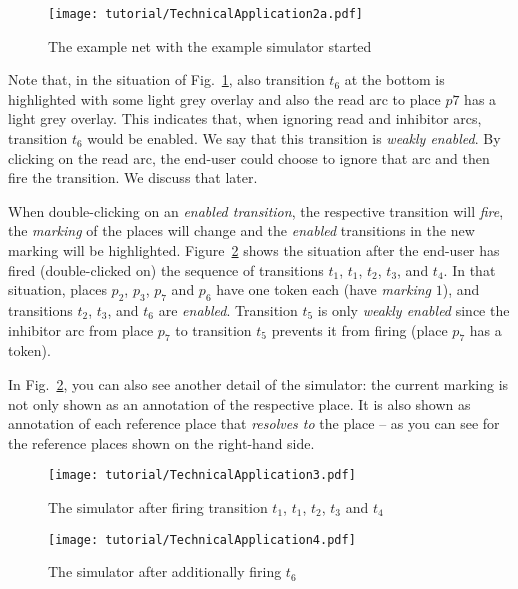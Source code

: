 \begin{figure}[hbtp!!]
  \centerline{\texttt{[image: tutorial/TechnicalApplication2a.pdf]}}
  \caption{The example net with the example simulator started}
  \label{fig:tutorial:app2}
\end{figure}

Note that, in the situation of  Fig.~\ref{fig:tutorial:app2}, also transition
$t_6$ at the bottom is highlighted with some light grey overlay and also
the read arc to place $p7$ has a light grey overlay. This indicates that, when
ignoring read and inhibitor arcs, transition $t_6$ would be enabled. We say
that this transition is \emph{weakly enabled}. By clicking on the read arc,
the end-user could choose to ignore that arc and then fire the transition. We
discuss that later.

When double-clicking on an \emph{enabled transition}, the respective transition
will \emph{fire}, the \emph{marking} of the places will change and the
\emph{enabled} transitions in the new marking will be highlighted. Figure~\ref{fig:tutorial:app3} shows
the situation after the end-user has fired (double-clicked on) the sequence
of transitions $t_1$, $t_1$, $t_2$, $t_3$, and $t_4$. In that situation, places
$p_2$, $p_3$, $p_7$ and $p_6$ have one token each (have \emph{marking} $1$), and
transitions $t_2$,  $t_3$, and $t_6$ are \emph{enabled}. Transition $t_5$ is
only \emph{weakly enabled} since the inhibitor arc from place $p_7$ to
transition $t_5$ prevents it from firing (place $p_7$ has a token).

In Fig.~\ref{fig:tutorial:app3}, you can also see another detail of the
simulator: the current marking is not only shown as an annotation of the
respective place. It is also shown as annotation of each reference place
that \emph{resolves to} the place -- as you can see for the reference places
shown on the right-hand side.
 
\begin{figure}[p!!]
  \centerline{\texttt{[image: tutorial/TechnicalApplication3.pdf]}}
  \caption{The simulator after firing transition $t_1$, $t_1$,
  $t_2$, $t_3$ and $t_4$}
  \label{fig:tutorial:app3}
\end{figure}

\begin{figure}[p!!]
  \centerline{\texttt{[image: tutorial/TechnicalApplication4.pdf]}}
  \caption{The simulator after additionally firing $t_6$}
  \label{fig:tutorial:app4}
\end{figure}

